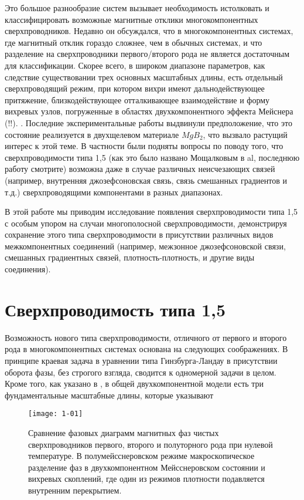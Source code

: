 Это большое разнообразие систем вызывает необходимость истолковать и 
классифицировать возможные магнитные отклики многокомпонентных 
сверхпроводников. Недавно он обсуждался, что в многокомпонентных системах, 
где магнитный отклик гораздо сложнее, чем в обычных системах, и что разделение 
на сверхпроводники первого/второго рода не является достаточным для 
классификации. Скорее всего, в широком диапазоне параметров, как следствие 
существовании трех основных масштабных длины, есть отдельный сверхпроводящий 
режим, при котором вихри имеют дальнодействующее притяжение, близкодействующее 
отталкивающее взаимодействие и форму вихревых узлов, погруженные в областях 
двухкомпонентного эффекта Мейснера (!!). \cite{bib:1,bib:2}. Последние 
экспериментальные работы \cite{bib:16,bib:17} выдвинули предположение, что 
это состояние реализуется в двухщелевом материале \( MgB_2 \), что вызвало 
растущий интерес к этой теме. В частности были подняты вопросы по поводу того, 
что сверхпроводимости типа 1,5 (как это было названо Мощалковым в 
al\cite{bib:16}, последнюю работу смотрите\cite{bib:18}) возможна даже в 
случае различных неисчезающих связей (например, внутренняя джозефсоновская 
связь, связь смешанных градиентов и т.д.) сверхпроводящими компонентами в 
разных диапазонах.

В этой работе мы приводим исследование появления сверхпроводимости типа 1,5 с 
особым упором на случаи многополосной сверхпроводимости, демонстрируя 
сохранение этого типа сверхпроводимости в присутствии различных видов 
межкомпонентных соединений (например, межзонное джозефсоновской связи, 
смешанных градиентных связей, плотность-плотность, и другие виды соединения).

\section{Сверхпроводимость типа 1,5}
\label{sec:1-1}

Возможность нового типа сверхпроводимости, отличного от первого и второго рода 
в многокомпонентных системах \cite{bib:1,bib:2} основана на следующих 
соображениях. В принципе краевая задача в уравнении типа Гинзбурга-Ландау в 
присутствии оборота фазы, без строгого взгляда, сводится к одномерной задачи 
в целом. Кроме того, как указано в \cite{bib:1,bib:2}, в общей 
двухкомпонентной модели есть три фундаментальные масштабные длины, которые 
указывают

\begin{figure}[h!]
  \texttt{[image: 1-01]}
  \caption{Сравнение фазовых диаграмм магнитных фаз чистых сверхпроводников
    первого, второго и полуторного рода при нулевой температуре. В 
    полумейсснеровском режиме макроскопическое разделение фаз в 
    двухкомпонентном Мейсснеровском состоянии и вихревых скоплений, где один 
    из режимов плотности подавляется внутренним перекрытием.}
  \label{fig:1}
\end{figure}

